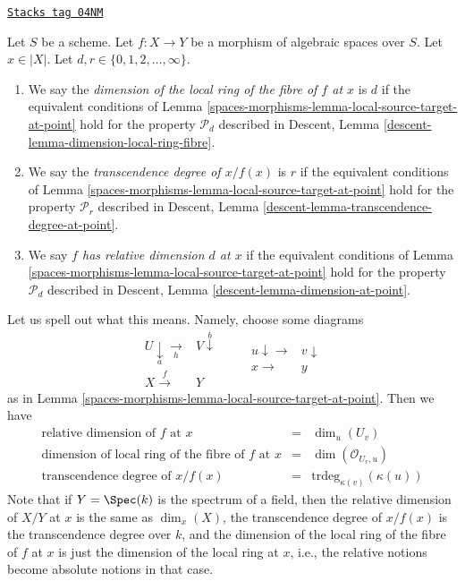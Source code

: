 \begin{definition}
\label{spaces-morphisms-definition-dimension-fibre}
\href{https://stacks.math.columbia.edu/tag/04NM}{\texttt{Stacks tag 04NM}}

Let $S$ be a scheme.
Let $f : X \to Y$ be a morphism of algebraic spaces over $S$.
Let $x \in |X|$.
Let $d, r \in \{0, 1, 2, \ldots, \infty\}$.
\begin{enumerate}
\item We say the
{\it dimension of the local ring of the fibre of $f$ at $x$} is $d$
if the equivalent conditions of
Lemma \ref{spaces-morphisms-lemma-local-source-target-at-point}
hold for the property
$\mathcal{P}_d$ described in
Descent, Lemma \ref{descent-lemma-dimension-local-ring-fibre}.
\item We say the
{\it transcendence degree of $x/f(x)$} is $r$
if the equivalent conditions of
Lemma \ref{spaces-morphisms-lemma-local-source-target-at-point}
hold for the property
$\mathcal{P}_r$ described in
Descent, Lemma \ref{descent-lemma-transcendence-degree-at-point}.
\item We say
{\it $f$ has relative dimension $d$ at $x$}
if the equivalent conditions of
Lemma \ref{spaces-morphisms-lemma-local-source-target-at-point}
hold for the property
$\mathcal{P}_d$ described in
Descent, Lemma \ref{descent-lemma-dimension-at-point}.
\end{enumerate}
\end{definition}

Let us spell out what this means. Namely, choose some
diagrams
$$
\begin{array}{cc}U \underset{a}{\downarrow}\underset{h}{\longrightarrow} & V \overset{b}{\downarrow} \\ X \overset{f}{\longrightarrow} & Y\end{array}
\quad\quad
\begin{array}{cc}u \downarrow\longrightarrow & v \downarrow \\ x \longrightarrow & y\end{array}
$$
as in
Lemma \ref{spaces-morphisms-lemma-local-source-target-at-point}.
Then we have
$$
\begin{matrix}
\text{relative dimension of }f\text{ at }x & = &
\dim_u (U_v) \\
\text{dimension of local ring of the fibre of }f\text{ at }x & = &
\dim(\mathcal{O}_{U_v, u})\\
\text{transcendence degree of }x/f(x) & = &
\text{trdeg}_{\kappa(v)}(\kappa(u))
\end{matrix}
$$
Note that if $Y = \Spec(k)$ is the spectrum of a field, then
the relative dimension of $X/Y$ at $x$ is the same as $\dim_x(X)$,
the transcendence degree of $x/f(x)$ is the transcendence degree
over $k$, and the dimension of the local ring of the fibre of $f$
at $x$ is just the dimension of the local ring at $x$, i.e., the
relative notions become absolute notions in that case.

